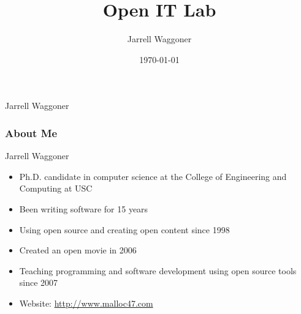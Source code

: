 \documentclass{beamer}
\title[Developers]{Open IT Lab}
\author{Jarrell Waggoner}
\institute[Open IT Lab] {Open IT Lab\\
  \medskip
      {\emph{waggonej@email.sc.edu}} }
\date{\today}
\begin{document}
\rm

{
  \begin{frame}
    \vspace{18em}

    \begin{center}\large{\textcolor{beamer@mygrey}{Jarrell Waggoner}}\end{center}


  \end{frame}
}

\begin{frame}
  \frametitle{About Me}
  \begin{LARGE}
    Jarrell Waggoner
  \end{LARGE}
  \begin{Large}
    \begin{itemize}
    \item Ph.D. candidate in computer science at the College of
      Engineering and Computing at USC
    \item Been writing software for 15 years
    \item Using open source and creating open content since 1998
    \item Created an open movie in 2006
    \item Teaching programming and software development using open source tools since 2007
    \item Website: \textcolor{beamer@myblue}{\href{http://www.malloc47.com}{http://www.malloc47.com}}
    \end{itemize}
  \end{Large}
\end{frame}
\end{document}
